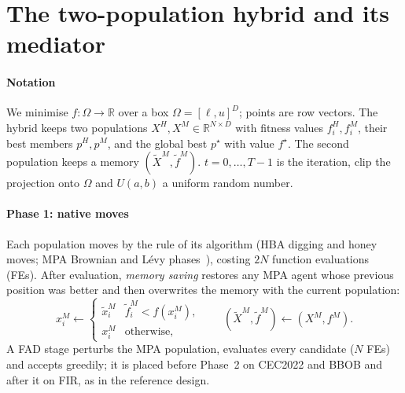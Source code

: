 \section{The two-population hybrid and its mediator}
\label{sec:hybrid}

\paragraph{Notation} We minimise $f:\Omega\to\mathbb{R}$ over a box $\Omega=[\ell,u]^D$; points are row vectors. The hybrid
keeps two populations $X^H,X^M\in\mathbb{R}^{N\times D}$ with fitness values $f^H_i,f^M_i$, their best members $p^H,p^M$,
and the global best $p^\star$ with value $f^\star$. The second population keeps a memory $(\tilde X^M,\tilde f^M)$.
$t=0,\dots,T-1$ is the iteration, $\mathrm{clip}$ the projection onto $\Omega$ and $U(a,b)$ a uniform random number.

\paragraph{Phase 1: native moves} Each population moves by the rule of its algorithm (HBA digging and honey moves; MPA
Brownian and L\'evy phases~\citep{hashim2022hba,faramarzi2020mpa}), costing $2N$ function evaluations (FEs). After
evaluation, \emph{memory saving} restores any MPA agent whose previous position was better and then overwrites the memory
with the current population:
\begin{equation}
x^M_i \leftarrow \begin{cases}\tilde x^M_i & \tilde f^M_i < f(x^M_i),\\ x^M_i & \text{otherwise},\end{cases}
\qquad (\tilde X^M,\tilde f^M)\leftarrow (X^M, f^M).
\label{eq:memory}
\end{equation}
A FAD stage perturbs the MPA population, evaluates every candidate ($N$ FEs) and accepts greedily; it is placed before
Phase~2 on CEC2022 and BBOB and after it on FIR, as in the reference design.

